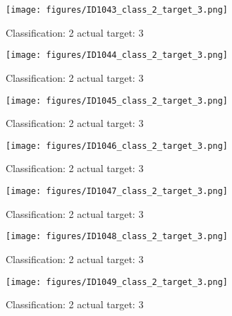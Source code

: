 \begin{figure}[h!]
\begin{center}
\texttt{[image: figures/ID1043\_class\_2\_target\_3.png]}
\end{center}
\caption{ Classification: 2 actual target: 3}
\label{fig:ID1043_class_2_target_3}
\end{figure}
\begin{figure}[h!]
\begin{center}
\texttt{[image: figures/ID1044\_class\_2\_target\_3.png]}
\end{center}
\caption{ Classification: 2 actual target: 3}
\label{fig:ID1044_class_2_target_3}
\end{figure}
\begin{figure}[h!]
\begin{center}
\texttt{[image: figures/ID1045\_class\_2\_target\_3.png]}
\end{center}
\caption{ Classification: 2 actual target: 3}
\label{fig:ID1045_class_2_target_3}
\end{figure}
\begin{figure}[h!]
\begin{center}
\texttt{[image: figures/ID1046\_class\_2\_target\_3.png]}
\end{center}
\caption{ Classification: 2 actual target: 3}
\label{fig:ID1046_class_2_target_3}
\end{figure}
\begin{figure}[h!]
\begin{center}
\texttt{[image: figures/ID1047\_class\_2\_target\_3.png]}
\end{center}
\caption{ Classification: 2 actual target: 3}
\label{fig:ID1047_class_2_target_3}
\end{figure}
\begin{figure}[h!]
\begin{center}
\texttt{[image: figures/ID1048\_class\_2\_target\_3.png]}
\end{center}
\caption{ Classification: 2 actual target: 3}
\label{fig:ID1048_class_2_target_3}
\end{figure}
\begin{figure}[h!]
\begin{center}
\texttt{[image: figures/ID1049\_class\_2\_target\_3.png]}
\end{center}
\caption{ Classification: 2 actual target: 3}
\label{fig:ID1049_class_2_target_3}
\end{figure}
